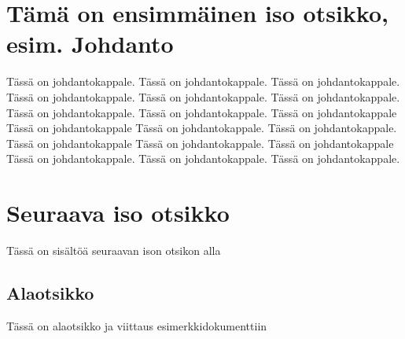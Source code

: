\documentclass[a4paper]{article}
\begin{document}
\section{Tämä on ensimmäinen iso otsikko, esim. Johdanto}

Tässä on johdantokappale. Tässä on johdantokappale. Tässä on johdantokappale. Tässä on johdantokappale. Tässä on johdantokappale. Tässä on johdantokappale. Tässä on johdantokappale. Tässä on johdantokappale. Tässä on johdantokappale Tässä on johdantokappale Tässä on johdantokappale. Tässä on johdantokappale. Tässä on johdantokappale Tässä on johdantokappale. Tässä on johdantokappale Tässä on johdantokappale. Tässä on johdantokappale. Tässä on johdantokappale.

\section{Seuraava iso otsikko}

Tässä on sisältöä seuraavan ison otsikon alla

\subsection{Alaotsikko}

Tässä on alaotsikko ja viittaus esimerkkidokumenttiin \citep{koski2012}




\end{document}
